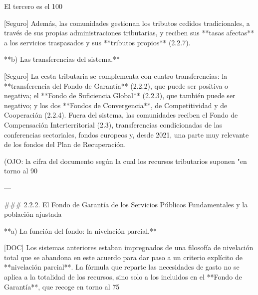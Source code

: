 \documentclass[10pt,a4paper]{article}
\begin{document}
El tercero es el 100%

[Seguro] Además, las comunidades gestionan los tributos cedidos tradicionales, a través de sus propias administraciones tributarias, y reciben sus **tasas afectas** a los servicios traspasados y sus **tributos propios** (2.2.7).

**b) Las transferencias del sistema.**

[Seguro] La cesta tributaria se complementa con cuatro transferencias: la **transferencia del Fondo de Garantía** (2.2.2), que puede ser positiva o negativa; el **Fondo de Suficiencia Global** (2.2.3), que también puede ser negativo; y los dos **Fondos de Convergencia**, de Competitividad y de Cooperación (2.2.4). Fuera del sistema, las comunidades reciben el Fondo de Compensación Interterritorial (2.3), transferencias condicionadas de las conferencias sectoriales, fondos europeos y, desde 2021, una parte muy relevante de los fondos del Plan de Recuperación.

(OJO: la cifra del documento según la cual los recursos tributarios suponen "en torno al 90%

---

### 2.2.2. El Fondo de Garantía de los Servicios Públicos Fundamentales y la población ajustada

**a) La función del fondo: la nivelación parcial.**

[DOC] Los sistemas anteriores estaban impregnados de una filosofía de nivelación total que se abandona en este acuerdo para dar paso a un criterio explícito de **nivelación parcial**. La fórmula que reparte las necesidades de gasto no se aplica a la totalidad de los recursos, sino solo a los incluidos en el **Fondo de Garantía**, que recoge en torno al 75%
\end{document}
